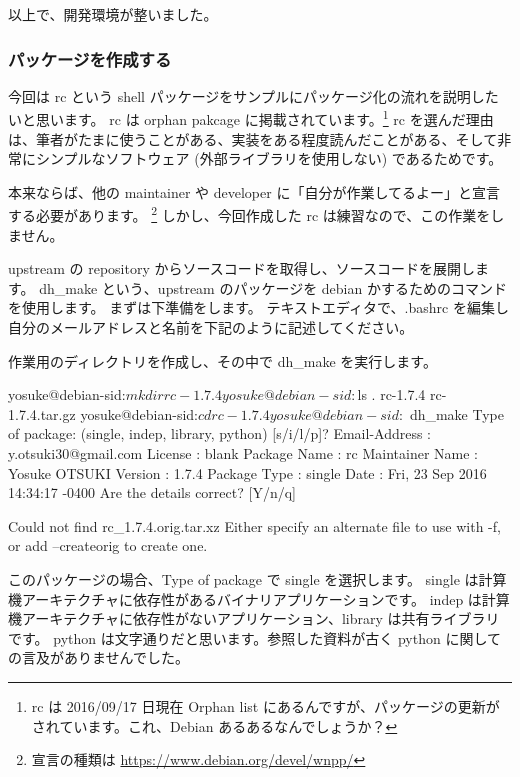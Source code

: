 \documentclass[mingoth,a4paper]{jsarticle}
\begin{document}
以上で、開発環境が整いました。

\subsubsection{ パッケージを作成する }
今回は rc という shell パッケージをサンプルにパッケージ化の流れを説明したいと思います。
rc は orphan pakcage に掲載されています。\footnote{ rc は 2016/09/17 日現在 Orphan list にあるんですが、パッケージの更新がされています。これ、Debian あるあるなんでしょうか？ }
rc を選んだ理由は、筆者がたまに使うことがある、実装をある程度読んだことがある、そして非常にシンプルなソフトウェア (外部ライブラリを使用しない) であるためです。

本来ならば、他の maintainer や developer に「自分が作業してるよー」と宣言する必要があります。
\footnote{宣言の種類は \url{https://www.debian.org/devel/wnpp/} }
しかし、今回作成した rc は練習なので、この作業をしません。

upstream の repository からソースコードを取得し、ソースコードを展開します。
dh\_make という、upstream のパッケージを debian かするためのコマンドを使用します。
まずは下準備をします。 テキストエディタで、.bashrc を編集し自分のメールアドレスと名前を下記のように記述してください。


作業用のディレクトリを作成し、その中で dh\_make を実行します。

\begin{commandline}
yosuke@debian-sid:$mkdir rc-1.7.4
yosuke@debian-sid:$ls . 
rc-1.7.4 rc-1.7.4.tar.gz
yosuke@debian-sid:$ cd rc-1.7.4 
yosuke@debian-sid:$ dh_make
Type of package: (single, indep, library, python)
[s/i/l/p]?
Email-Address       : y.otsuki30@gmail.com
License             : blank
Package Name        : rc
Maintainer Name     : Yosuke OTSUKI
Version             : 1.7.4
Package Type        : single
Date                : Fri, 23 Sep 2016 14:34:17 -0400
Are the details correct? [Y/n/q]

Could not find rc_1.7.4.orig.tar.xz
Either specify an alternate file to use with -f,
or add --createorig to create one.
\end{commandline}

このパッケージの場合、Type of package で single を選択します。
single は計算機アーキテクチャに依存性があるバイナリアプリケーションです。
indep は計算機アーキテクチャに依存性がないアプリケーション、library は共有ライブラリです。
python は文字通りだと思います。参照した資料が古く python に関しての言及がありませんでした。
\end{document}
